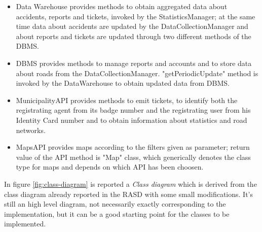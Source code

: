 \documentclass[a4paper]{report}
\begin{document}
\begin{itemize}
\item Data Warehouse provides methods to obtain aggregated data about accidents, reports and tickets, invoked by the StatisticsManager; at the same time data about accidents are updated by the DataCollectionManager and about reports and tickets are updated through two different methods of the DBMS.
\item DBMS provides methods to manage reports and accounts and to store data about roads from the DataCollectionManager. "getPeriodicUpdate" method is invoked by the DataWarehouse to obtain updated data from DBMS.
\item MunicipalityAPI provides methods to emit tickets, to identify both the registrating agent from its badge number and the registrating user from his Identity Card number and to obtain information about statistics and road networks.
\item MapsAPI provides maps according to the filters given as parameter; return value of the API method is "Map" class, which generically denotes the class type for maps and depends on which API has been choosen.
\end{itemize}
In figure \ref{fig:class-diagram} is reported a \textit{Class diagram} which is derived from the class diagram already reported in the RASD with some small modifications. It's still an high level diagram, not necessarily exactly corresponding to the implementation, but it can be a good starting point for the classes to be implemented.
\end{document}
